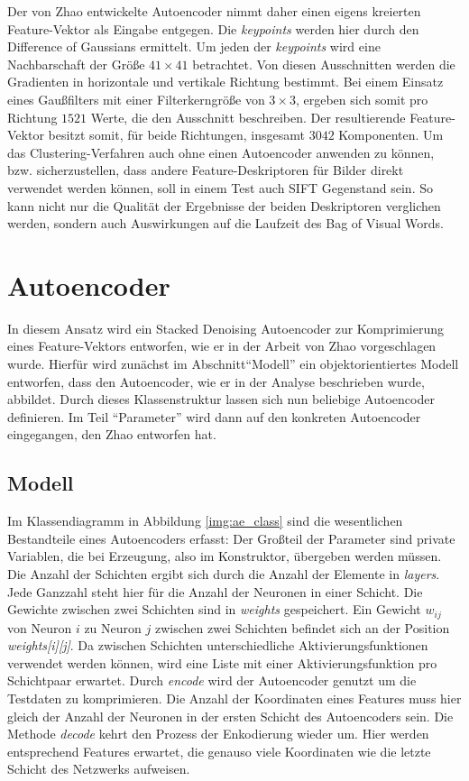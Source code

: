 Der von Zhao \cite{aed2016} entwickelte Autoencoder nimmt daher einen eigens kreierten Feature-Vektor als Eingabe entgegen. Die \textit{keypoints} werden hier durch den Difference of Gaussians ermittelt. Um jeden der \textit{keypoints} wird eine Nachbarschaft der Größe $41 \times 41$ betrachtet. Von diesen Ausschnitten werden die Gradienten in horizontale und vertikale Richtung bestimmt. Bei einem Einsatz eines Gaußfilters mit einer Filterkerngröße von $3 \times 3$, ergeben sich somit pro Richtung $1521$ Werte, die den Ausschnitt beschreiben. Der resultierende Feature-Vektor besitzt somit, für beide Richtungen, insgesamt $3042$ Komponenten.\newline
Um das Clustering-Verfahren auch ohne einen Autoencoder anwenden zu können, bzw. sicherzustellen, dass andere Feature-Deskriptoren für Bilder direkt verwendet werden können, soll in einem Test auch SIFT Gegenstand sein. So kann nicht nur die Qualität der Ergebnisse der beiden Deskriptoren verglichen werden, sondern auch Auswirkungen auf die Laufzeit des Bag of Visual Words.

\section{Autoencoder}

In diesem Ansatz wird ein Stacked Denoising Autoencoder zur Komprimierung eines Feature-Vektors entworfen, wie er in der Arbeit von Zhao \cite{aed2016} vorgeschlagen wurde. Hierfür wird zunächst im Abschnitt\enquote{Modell} ein objektorientiertes Modell entworfen, dass den Autoencoder, wie er in der Analyse beschrieben wurde, abbildet. Durch dieses Klassenstruktur lassen sich nun beliebige Autoencoder definieren. Im Teil \enquote{Parameter} wird dann auf den konkreten Autoencoder eingegangen, den Zhao entworfen hat.

\subsection{Modell}

Im Klassendiagramm in Abbildung \ref{img:ae_class} sind die wesentlichen Bestandteile eines Autoencoders erfasst: Der Großteil der Parameter sind private Variablen, die bei Erzeugung, also im Konstruktor, übergeben werden müssen. Die Anzahl der Schichten ergibt sich durch die Anzahl der Elemente in \textit{layers}. Jede Ganzzahl steht hier für die Anzahl der Neuronen in einer Schicht. Die Gewichte zwischen zwei Schichten sind in \textit{weights} gespeichert. Ein  Gewicht $w_{ij}$ von Neuron $i$ zu Neuron $j$ zwischen zwei Schichten befindet sich an der Position \textit{weights[i][j]}. Da zwischen Schichten unterschiedliche Aktivierungsfunktionen verwendet werden können, wird eine Liste  mit einer Aktivierungsfunktion pro Schichtpaar erwartet. \newline
Durch \textit{encode} wird der Autoencoder genutzt um die Testdaten zu komprimieren. Die Anzahl der Koordinaten eines Features muss hier gleich der Anzahl der Neuronen in der ersten Schicht des Autoencoders sein. Die Methode \textit{decode} kehrt den Prozess der Enkodierung wieder um. Hier werden entsprechend Features erwartet, die genauso viele Koordinaten wie die letzte Schicht des Netzwerks aufweisen.
  

